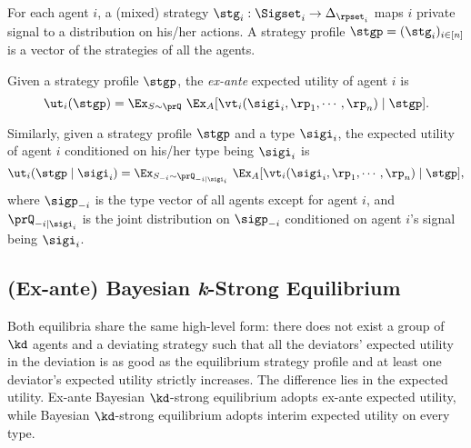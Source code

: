 For each agent $i$, a (mixed) strategy $\stg_i: \Sigset_i \to \Delta_{\rpset_i}$ maps $i$ private signal to a distribution on his/her actions. A strategy profile $\stgp = (\stg_i)_{i \in [n]}$ is a vector of the strategies of all the agents. 

Given a strategy profile $\stgp$, the {\em ex-ante} expected utility of agent $i$ is 
\begin{equation*}
    \ut_i(\stgp) = \Ex_{S \sim \prQ}\ \Ex_{A}[\vt_i(\sigi_i, \rp_1, \cdots, \rp_n)\mid \stgp].
\end{equation*}

Similarly, given a strategy profile $\stgp$ and a type $\sigi_i$, the {\em \qi{}} expected utility of agent $i$ conditioned on his/her type being $\sigi_i$ is 
\begin{equation*}
    \ut_i(\stgp \mid \sigi_i) = \Ex_{S_{-i} \sim \prQ_{-i\mid \sigi_i}}\ \Ex_{A}[\vt_i(\sigi_i, \rp_1, \cdots, \rp_n)\mid \stgp],
\end{equation*}
where $\sigp_{-i}$ is the type vector of all agents except for agent $i$, and $\prQ_{-i\mid \sigi_i}$ is the joint distribution on $\sigp_{-i}$ conditioned on agent $i$'s signal being $\sigi_{i}$. 

\subsection{(Ex-ante) Bayesian \textit{k}-Strong Equilibrium}

Both equilibria share the same high-level form: there does not exist a group of $\kd$ agents and a deviating strategy such that all the deviators' expected utility in the deviation is as good as the equilibrium strategy profile and at least one deviator's expected utility strictly increases. The difference lies in the expected utility. Ex-ante Bayesian $\kd$-strong equilibrium adopts ex-ante expected utility, while Bayesian $\kd$-strong equilibrium adopts interim expected utility on every type. 

